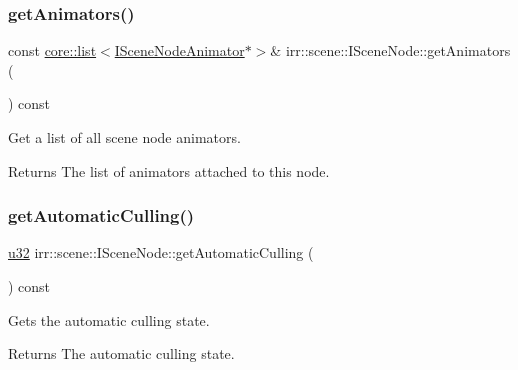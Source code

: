 \subsubsection{\texorpdfstring{get\+Animators()}{getAnimators()}\hspace{0.1cm}{\footnotesize\ttfamily [2/2]}}
{\footnotesize\ttfamily const \hyperlink{classirr_1_1core_1_1list}{core\+::list}$<$\hyperlink{classirr_1_1scene_1_1ISceneNodeAnimator}{I\+Scene\+Node\+Animator}$\ast$$>$\& irr\+::scene\+::\+I\+Scene\+Node\+::get\+Animators (\begin{DoxyParamCaption}{ }\end{DoxyParamCaption}) const\hspace{0.3cm}{\ttfamily [inline]}}



Get a list of all scene node animators. 

\begin{DoxyReturn}{Returns}
The list of animators attached to this node. 
\end{DoxyReturn}
\mbox{\label{classirr_1_1scene_1_1ISceneNode_a0748cd5c678e41a4fcff0514937c77be}} 
\subsubsection{\texorpdfstring{get\+Automatic\+Culling()}{getAutomaticCulling()}\hspace{0.1cm}{\footnotesize\ttfamily [1/2]}}
{\footnotesize\ttfamily \hyperlink{namespaceirr_a0416a53257075833e7002efd0a18e804}{u32} irr\+::scene\+::\+I\+Scene\+Node\+::get\+Automatic\+Culling (\begin{DoxyParamCaption}{ }\end{DoxyParamCaption}) const\hspace{0.3cm}{\ttfamily [inline]}}



Gets the automatic culling state. 

\begin{DoxyReturn}{Returns}
The automatic culling state. 
\end{DoxyReturn}
\mbox{\label{classirr_1_1scene_1_1ISceneNode_a0748cd5c678e41a4fcff0514937c77be}} 

